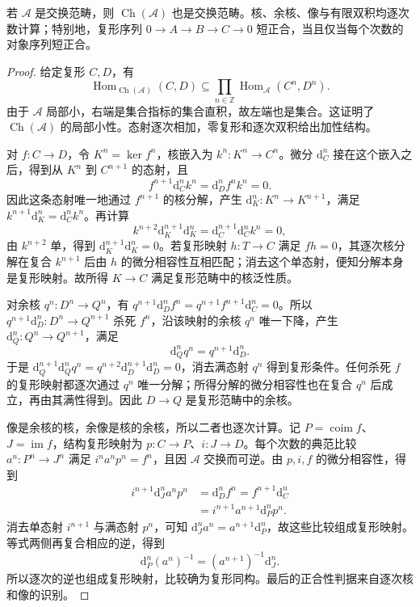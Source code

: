 \begin{proposition}\label{b4:prop:complex-category-abelian}
	若 \(\mathcal A\) 是交换范畴，则 \(\operatorname{Ch}(\mathcal A)\) 也是交换范畴。核、余核、像与有限双积均逐次数计算；特别地，复形序列 \(0\to A\to B\to C\to0\) 短正合，当且仅当每个次数的对象序列短正合。
\end{proposition}
\begin{proof}
	给定复形 \(C,D\)，有
	\[
		\operatorname{Hom}_{\operatorname{Ch}(\mathcal A)}(C,D) \subseteq\prod_{n\in\mathbb Z}\operatorname{Hom}_{\mathcal A}(C^n,D^n).
	\]
	由于 \(\mathcal A\) 局部小，右端是集合指标的集合直积，故左端也是集合。这证明了 \(\operatorname{Ch}(\mathcal A)\) 的局部小性。态射逐次相加，零复形和逐次双积给出加性结构。

	对 \(f:C\to D\)，令 \(K^n=\ker f^n\)，核嵌入为 \(k^n:K^n\to C^n\)。微分 \(\mathrm{d}_C^n\) 接在这个嵌入之后，得到从 \(K^n\) 到 \(C^{n+1}\) 的态射，且
	\[
		f^{n+1}\mathrm{d}_C^nk^n=\mathrm{d}_D^nf^nk^n=0.
	\]
	因此这条态射唯一地通过 \(f^{n+1}\) 的核分解，产生 \(\mathrm{d}_K^n:K^n\to K^{n+1}\)，满足 \(k^{n+1}\mathrm{d}_K^n=\mathrm{d}_C^nk^n\)。再计算
	\[
		k^{n+2}\mathrm{d}_K^{n+1}\mathrm{d}_K^n =\mathrm{d}_C^{n+1}\mathrm{d}_C^nk^n=0,
	\]
	由 \(k^{n+2}\) 单，得到 \(\mathrm{d}_K^{n+1}\mathrm{d}_K^n=0\)。若复形映射 \(h:T\to C\) 满足 \(fh=0\)，其逐次核分解在复合 \(k^{n+1}\) 后由 \(h\) 的微分相容性互相匹配；消去这个单态射，便知分解本身是复形映射。故所得 \(K\to C\) 满足复形范畴中的核泛性质。

	对余核 \(q^n:D^n\to Q^n\)，有 \(q^{n+1}\mathrm{d}_D^nf^n=q^{n+1}f^{n+1}\mathrm{d}_C^n=0\)。所以 \(q^{n+1}\mathrm{d}_D^n:D^n\to Q^{n+1}\) 杀死 \(f^n\)，沿该映射的余核 \(q^n\) 唯一下降，产生 \(\mathrm{d}_Q^n:Q^n\to Q^{n+1}\)，满足
	\[
		\mathrm{d}_Q^nq^n=q^{n+1}\mathrm{d}_D^n.
	\]
	于是 \(\mathrm{d}_Q^{n+1}\mathrm{d}_Q^nq^n=q^{n+2}\mathrm{d}_D^{n+1}\mathrm{d}_D^n=0\)，消去满态射 \(q^n\) 得到复形条件。任何杀死 \(f\) 的复形映射都逐次通过 \(q^n\) 唯一分解；所得分解的微分相容性也在复合 \(q^n\) 后成立，再由其满性得到。因此 \(D\to Q\) 是复形范畴中的余核。

	像是余核的核，余像是核的余核，所以二者也逐次计算。记 \(P=\operatorname{coim}f\)、\(J=\operatorname{im}f\)，结构复形映射为 \(p:C\to P\)、\(i:J\to D\)。每个次数的典范比较 \(a^n:P^n\to J^n\) 满足 \(i^na^np^n=f^n\)，且因 \(\mathcal A\) 交换而可逆。由 \(p,i,f\) 的微分相容性，得到
	\[
		\begin{aligned}
			i^{n+1}\mathrm{d}_J^na^np^n &=\mathrm{d}_D^nf^n=f^{n+1}\mathrm{d}_C^n\\
			&=i^{n+1}a^{n+1}\mathrm{d}_P^np^n.
		\end{aligned}
	\]
	消去单态射 \(i^{n+1}\) 与满态射 \(p^n\)，可知 \(\mathrm{d}_J^na^n=a^{n+1}\mathrm{d}_P^n\)，故这些比较组成复形映射。等式两侧再复合相应的逆，得到
	\[
		\mathrm{d}_P^n(a^n)^{-1}=(a^{n+1})^{-1}\mathrm{d}_J^n.
	\]
	所以逐次的逆也组成复形映射，比较确为复形同构。最后的正合性判据来自逐次核和像的识别。
\end{proof}

